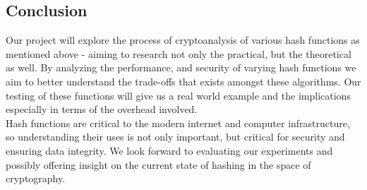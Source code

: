 \documentclass[12pt,english]{article}
\begin{document}
\subsection{Conclusion}
Our project will explore the process of cryptoanalysis of various hash functions as mentioned above - aiming to research not only the practical, but the theoretical as well. By analyzing the performance, and security of varying hash functions we aim to better understand the trade-offs that exists amongst these algorithms. Our testing of these functions will give us a real world example and the implications especially in terms of the overhead involved. \\

Hash functions are critical to the modern internet and computer infrastructure, so understanding their uses is not only important, but critical for security and ensuring data integrity. We look forward to evaluating our experiments and possibly offering insight on the current state of hashing in the space of cryptography.
\end{document}

